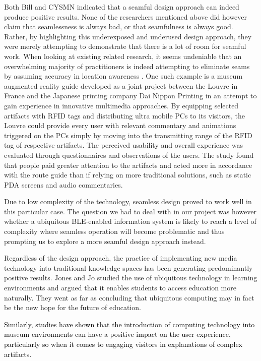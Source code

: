 \documentclass[prodmode,acmtomm]{acmsmall}
\begin{document}
Both Bill and CYSMN indicated that a seamful design approach can indeed produce positive results. None of the researchers mentioned above did however claim that seamlessness is always bad, or that seamfulness is always good. Rather, by highlighting this underexposed and underused design approach, they were merely attempting to demonstrate that there is a lot of room for seamful work. When looking at existing related research, it seems undeniable that an overwhelming majority of practitioners is indeed attempting to eliminate seams by assuming accuracy in location awareness \cite{yin2015}. One such example is a museum augmented reality guide developed as a joint project between the Louvre in France and the Japanese printing company Dai Nippon Printing \cite{Arnaudov2008} in an attempt to gain experience in innovative multimedia approaches. By equipping selected artifacts with RFID tags and distributing ultra mobile PCs to its visitors, the Louvre could provide every user with relevant commentary and animations triggered on the PCs simply by moving into the transmitting range of the RFID tag of respective artifacts. The perceived usability and overall experience was evaluated through questionnaires and observations of the users. The study found that people paid greater attention to the artifacts and acted more in accordance with the route guide than if relying on more traditional solutions, such as static PDA screens and audio commentaries. 

Due to low complexity of the technology, seamless design proved to work well in this particular case. The question we had to deal with in our project was however whether a ubiquitous BLE-enabled information system is likely to reach a level of complexity where seamless operation will become problematic and thus prompting us to explore a more seamful design approach instead.

Regardless of the design approach, the practice of implementing new media technology into traditional knowledge spaces has been generating predominantly positive results. Jones and Jo \cite{jones2004} studied the use of ubiquitous technology in learning environments and argued that it enables students to access education more naturally. They went as far as concluding that ubiquitous computing may in fact be the new hope for the future of education. 

\textcolor{black}{Similarly, studies have shown that the introduction of computing technology into museum environments can have a positive impact on the user experience, particularly so when it comes to engaging visitors in explanations of complex artifacts. \cite{yamazaki2009}}
\end{document}
